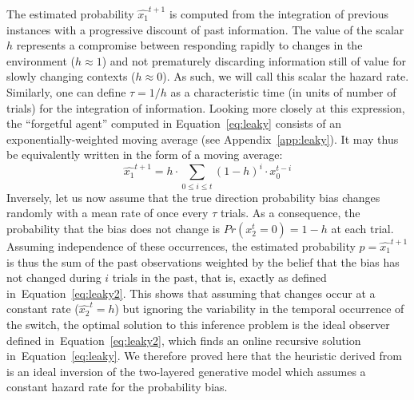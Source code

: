 \documentclass[12pt,english]{article}%
\newcommand{\eql}[1]{\begin{equation}#1\end{equation}}
\newcommand{\citet}[1]{\textcite{#1}}
\newcommand{\seeEq}[1]{Equation~\ref{eq:#1}}
\newcommand{\seeApp}[1]{Appendix~\ref{app:#1}}
\begin{document}
The estimated probability $\hat{x_1}^{t+1}$ is computed
from the integration of previous instances
with a progressive discount of past information.
The value of the scalar $h$ represents
a compromise between responding rapidly
to changes in the environment ($h \approx 1$) and
not prematurely discarding information still of value
for slowly changing contexts  ($h \approx 0$).
As such, we will call this scalar the hazard rate.
Similarly, one can define $\tau = 1 / h$ as
a characteristic time (in units of number of trials)
for the integration of information.
Looking more closely at this expression,
the ``forgetful agent'' computed in \seeEq{leaky}
consists of an exponentially-weighted moving average (see \seeApp{leaky}).
It may thus be equivalently written in the form of a moving average:
\eql{
\hat{x_1}^{t+1} = h \cdot \sum_{0\leq i \leq t} (1 - h)^{i} \cdot x_0^{t-i}
\label{eq:leaky2}}
Inversely, let us now assume that
the true direction probability bias changes randomly with a mean rate of once
every $\tau$ trials.
As a consequence, the probability that the bias does not change is $Pr(x_2^t=0)=1-h$ at each trial.
Assuming independence of these occurrences, the estimated probability $p=\hat{x_1}^{t+1}$ is thus the sum
of the past observations weighted by the belief that the bias has not changed during $i$ trials in the past, that is, exactly as defined in~\seeEq{leaky2}.
This shows that
assuming that changes occur at a constant rate ($\hat{x_2}^t=h$)
but ignoring the variability in the temporal occurrence of the switch,
the optimal solution to this inference problem is the
ideal observer defined in~\seeEq{leaky2},
which finds an online recursive solution in~\seeEq{leaky}.
We therefore proved here that the heuristic derived from~\citet{Anderson2006}
is an ideal inversion of the two-layered generative model
which assumes a constant hazard rate for the probability bias.
\end{document}
